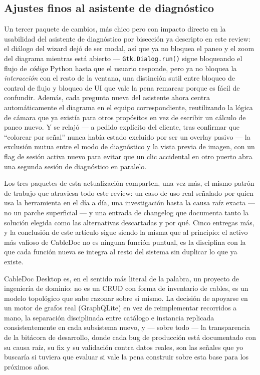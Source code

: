 \documentclass[11pt,twocolumn]{article}
\begin{document}
\subsection{Ajustes finos al asistente de diagnóstico}

Un tercer paquete de cambios, más chico pero con impacto directo en la usabilidad del asistente de diagnóstico por bisección ya descripto en este review: el diálogo del wizard dejó de ser modal, así que ya no bloquea el paneo y el zoom del diagrama mientras está abierto --- \texttt{Gtk.Dialog.run()} sigue bloqueando el flujo de \emph{código} Python hasta que el usuario responde, pero ya no bloquea la \emph{interacción} con el resto de la ventana, una distinción sutil entre bloqueo de control de flujo y bloqueo de UI que vale la pena remarcar porque es fácil de confundir. Además, cada pregunta nueva del asistente ahora centra automáticamente el diagrama en el equipo correspondiente, reutilizando la lógica de cámara que ya existía para otros propósitos en vez de escribir un cálculo de paneo nuevo. Y se relajó --- a pedido explícito del cliente, tras confirmar que ``colorear por señal'' nunca había estado excluido por ser un overlay pasivo --- la exclusión mutua entre el modo de diagnóstico y la vista previa de imagen, con un flag de sesión activa nuevo para evitar que un clic accidental en otro puerto abra una segunda sesión de diagnóstico en paralelo.

Los tres paquetes de esta actualización comparten, una vez más, el mismo patrón de trabajo que atraviesa todo este review: un caso de uso real señalado por quien usa la herramienta en el día a día, una investigación hasta la causa raíz exacta --- no un parche superficial --- y una entrada de changelog que documenta tanto la solución elegida como las alternativas descartadas y por qué. Cinco entregas más, y la conclusión de este artículo sigue siendo la misma que al principio: el activo más valioso de CableDoc no es ninguna función puntual, es la disciplina con la que cada función nueva se integra al resto del sistema sin duplicar lo que ya existe.



CableDoc Desktop es, en el sentido más literal de la palabra, un proyecto de ingeniería de dominio: no es un CRUD con forma de inventario de cables, es un modelo topológico que sabe razonar sobre sí mismo. La decisión de apoyarse en un motor de grafos real (GraphQLite) en vez de reimplementar recorridos a mano, la separación disciplinada entre catálogo e instancia replicada consistentemente en cada subsistema nuevo, y --- sobre todo --- la transparencia de la bitácora de desarrollo, donde cada bug de producción está documentado con su causa raíz, su fix y su validación contra datos reales, son las señales que yo buscaría si tuviera que evaluar si vale la pena construir sobre esta base para los próximos años.
\end{document}
